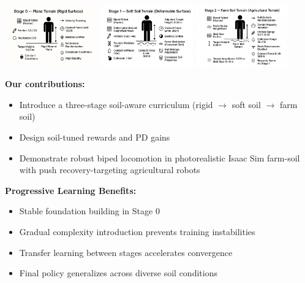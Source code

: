\documentclass[a1paper,portrait,fontscale=0.5]{baposter}
\newcommand{\compresslist}{%
\vspace{-0.5em}%
\setlength{\itemsep}{0pt}%
\setlength{\parskip}{0pt}%
\setlength{\parsep}{0pt}%
\setlength{\topsep}{0pt}%
}
\begin{document}
\begin{poster}
{\vspace{-2em}
\begin{center}
\includegraphics[width=0.3\textwidth]{stage_0.png}
\hspace{0.02\textwidth}
\includegraphics[width=0.3\textwidth]{stage_1.png}
\hspace{0.02\textwidth}
\includegraphics[width=0.3\textwidth]{stage_2.png}
\end{center}

\vspace{-3.5em}
\begin{multicols}{2}
\footnotesize
\textbf{Our contributions:}
\begin{itemize}\compresslist
    \item Introduce a three-stage soil-aware curriculum (rigid $\rightarrow$ soft soil $\rightarrow$ farm soil)
    \item Design soil-tuned rewards and PD gains
    \item Demonstrate robust biped locomotion in photorealistic Isaac Sim farm-soil with push recovery-targeting agricultural robots
\end{itemize}

\columnbreak

\textbf{Progressive Learning Benefits:}
\begin{itemize}\compresslist
    \item Stable foundation building in Stage 0
    \item Gradual complexity introduction prevents training instabilities
    \item Transfer learning between stages accelerates convergence
    \item Final policy generalizes across diverse soil conditions
\end{itemize}
\end{multicols}

}
\end{poster}
\end{document}
